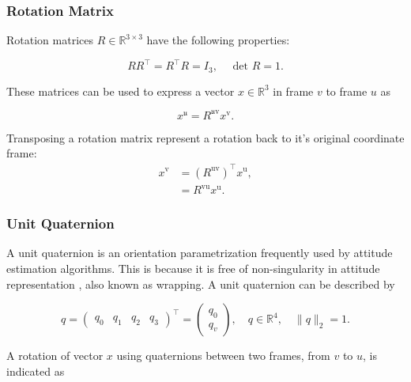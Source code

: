 \subsubsection{Rotation Matrix}
Rotation matrices $R \in \mathbb{R}^{3 \times 3}$ have the following properties:

\begin{equation}
	\label{eq:rot_mat_properties}
	R R^{\top}=R^{\top} R=I_{3}, \quad \text { det } R=1.
\end{equation}

These matrices can be used to express a vector $x \in \mathbb{R}^{3}$ in frame $v$ to frame $u$ as 

\begin{equation}
	\label{eq:rot_mat_rot_x}
	x^{\mathfrak{u}}=R^{\mathfrak{u} \mathrm{v}} x^{\mathrm{v}}.
\end{equation}

Transposing a rotation matrix represent a rotation back to it's original coordinate frame:
\begin{subequations}
	\begin{align}
		\label{eq:rot_mat_trans}
		x^{\mathrm{v}}&=\left(R^{\mathrm{uv}}\right)^{\top} x^{\mathrm{u}},\\
		&=R^{\mathrm{vu}} x^{\mathrm{u}}.
	\end{align}
\end{subequations}

\subsubsection{Unit Quaternion}
A unit quaternion is an orientation parametrization frequently used by attitude estimation algorithms. This is because it is free of non-singularity in attitude representation \cite{Hashim2019}, also known as wrapping. A unit quaternion can be described by

\begin{equation}
	\label{eq:unit_quarternion}
	q=\left(\begin{array}{llll}{q_{0}} & {q_{1}} & {q_{2}} & {q_{3}}\end{array}\right)^{\top}
	=\left(\begin{array}{l}{q_{0}} \\ {q_{v}}\end{array}\right), 
	\quad q \in \mathbb{R}^{4}, 
	\quad\|q\|_{2}=1.
\end{equation}

A rotation of vector $x$ using quaternions between two frames, from $v$ to $u$, is indicated as

